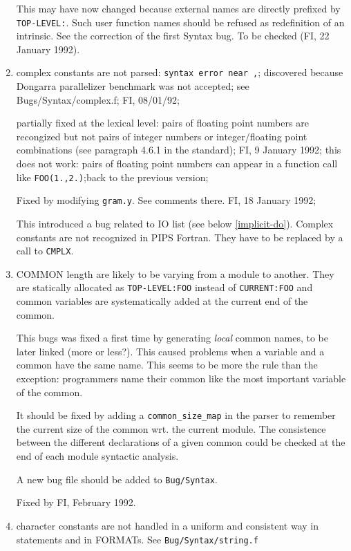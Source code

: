 \begin{enumerate}
	This may have now changed because external names are directly prefixed
	by \verb+TOP-LEVEL:+. Such user function names should
	be refused as redefinition of an intrinsic. 
	See the correction of the first Syntax bug.
	To be checked (FI, 22 January 1992).

  \item \label{complex-constant}
	complex constants are not parsed: \verb+syntax error near ,+;
	discovered because Dongarra parallelizer benchmark was not
	accepted; see Bugs/Syntax/complex.f; FI, 08/01/92; 

	partially fixed at the lexical level: pairs of floating point
	numbers are recongized but not pairs of integer numbers or
	integer/floating point combinations (see paragraph 4.6.1 in
	the standard); FI, 9 January 1992; this does not work: pairs
	of floating point numbers can appear in a function call like
	\verb+FOO(1.,2.)+;back
	to the previous version;

	Fixed by modifying \verb+gram.y+. See comments there.
	FI, 18 January 1992;

	This introduced a bug related to IO list (see below
	\ref{implicit-do}). Complex
	constants are not recognized in PIPS Fortran. They have to
	be replaced by a call to \verb+CMPLX+.

  \item COMMON length are likely to be varying from a module to another.
	They are statically allocated as \verb+TOP-LEVEL:FOO+ instead
	of \verb+CURRENT:FOO+ and common variables are systematically
	added at the current end of the common.

	This bugs was fixed a first time by generating {\em local}
	common names, to be later linked (more or less?). This caused
	problems when a variable and a common have the same name. This
	seems to be more the rule than the exception: programmers
	name their common like the most important variable of the
	common.

	It should be fixed by adding a \verb+common_size_map+ in the
	parser to remember the current size of the common wrt. the
	current module. The consistence between the different
	declarations of a given common could be checked at the
	end of each module syntactic analysis.

	A new bug file should be added to \verb+Bug/Syntax+.

	Fixed by FI, February 1992.

  \item character constants are not handled in a uniform and consistent
	way in statements and in FORMATs. See \verb+Bug/Syntax/string.f+


\end{enumerate}
